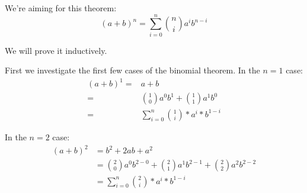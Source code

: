 \documentclass{proc-l}
\theoremstyle{definition}
\theoremstyle{remark}
\numberwithin{equation}{section}
\begin{document}
We're aiming for this theorem:
\[
(a + b)^n = \sum_{i=0}^n {n \choose i} a^i b^{n-i}
\]

We will prove it inductively.

First we investigate the first few cases of the binomial theorem. In the \(n = 1\) case:
\begin{align*}
(a + b)^1 = & a + b \\ 
= & {1 \choose 0}  a^0  b^1 + {1 \choose 1}  a^1  b^0  \\
= & \sum_{i=0}^n {1 \choose i} * a^i * b^{1-i}
\end{align*}

In the \(n = 2\) case:
\begin{align*}
(a + b)^2 & = b^2 + 2  a  b + a^2 \\
& = {2 \choose 0}  a^0  b^{2-0} + {2 \choose 1}  a^1  b^{2-1} + {2 \choose 2}  a^2  b^{2-2} \\
& = \sum_{i=0}^n {2 \choose i} * a^i * b^{1-i}
\end{align*}
\end{document}
